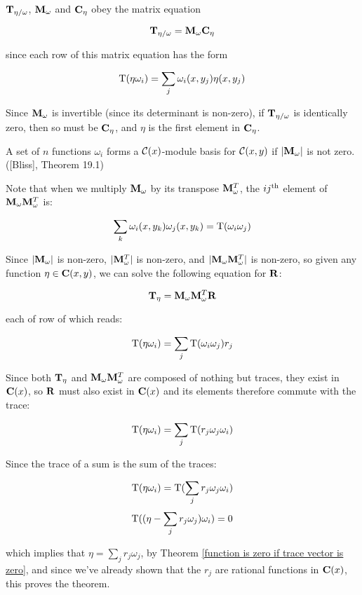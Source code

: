 \proof

${\bf T}_{\eta/\omega}$, ${\bf M}_\omega$ and ${\bf C}_\eta$
obey the matrix equation

$${\bf T}_{\eta/\omega} = {\bf M}_\omega {\bf C}_\eta$$

since each row of this matrix equation has the form

$$ {\rm T}(\eta \omega_i) = \sum_j \omega_i(x,y_j)\eta(x,y_j) $$

Since ${\bf M}_\omega$ is invertible (since its determinant is
non-zero), if ${\bf T}_{\eta/\omega}$ is identically zero, then so must be
${\bf C}_\eta$, and $\eta$ is the first element in ${\bf C}_\eta$.

\endtheorem

\theorem
\label{|M| != 0 implies C(x) basis}

A set of $n$ functions $\omega_i$ forms a ${\cal C}(x)$-module basis for
${\cal C}(x,y)$ if $|{\bf M}_\omega|$ is not zero. ([Bliss], Theorem 19.1)

\proof

Note that when we multiply ${\bf M}_\omega$ by its transpose ${\bf
M}_\omega^T$, the $ij^{\rm th}$ element of ${\bf M}_\omega{\bf
M}_\omega^T$ is:

$$ \sum_k \omega_i(x, y_k)\omega_j(x, y_k) = {\rm T}(\omega_i \omega_j)$$

Since $|{\bf M}_\omega|$ is non-zero, $|{\bf M}_\omega^T|$ is
non-zero, and $|{\bf M}_\omega{\bf M}_\omega^T|$ is non-zero, so given
any function $\eta \in {\bf C}(x,y)$, we can solve the following
equation for ${\bf R}$:

$${\bf T}_\eta = {\bf M}_\omega {\bf M}_\omega^T {\bf R}$$

each of row of which reads:

$$ {\rm T}(\eta \omega_i) = \sum_j {\rm T}(\omega_i \omega_j) r_j $$

Since both ${\bf T}_\eta$ and ${\bf M}_\omega{\bf M}_\omega^T$ are composed of
nothing but traces, they exist in ${\bf C}(x)$, so ${\bf R}$ must also
exist in ${\bf C}(x)$ and its elements therefore commute with the
trace:

$$ {\rm T}(\eta \omega_i) = \sum_j {\rm T}(r_j \omega_j \omega_i) $$

Since the trace of a sum is the sum of the traces:

$$ {\rm T}(\eta \omega_i) = {\rm T}(\sum_j r_j \omega_j \omega_i) $$
$$ {\rm T}((\eta - \sum_j r_j \omega_j) \omega_i) = 0 $$

which implies that $\eta = \sum_j r_j \omega_j$, by Theorem
\ref{function is zero if trace vector is zero}, and since we've
already shown that the $r_j$ are rational functions in ${\bf C}(x)$,
this proves the theorem.

